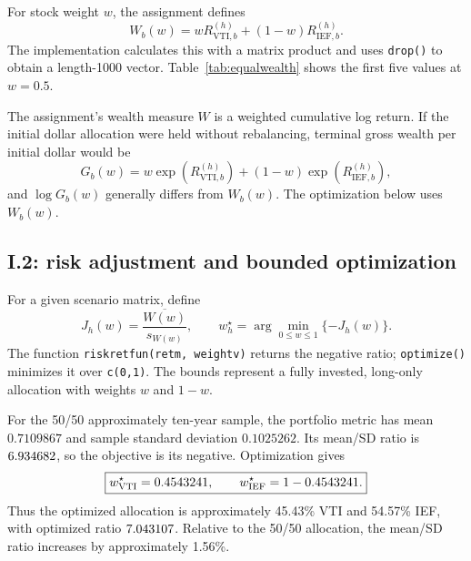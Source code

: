 \documentclass[11pt,letterpaper]{article}
\newcommand{\wideinput}[3]{%
  \begin{table}[H]\centering
  \caption{#2}\label{#3}
  \resizebox{\linewidth}{!}{}
  \end{table}}
\newcommand{\smallinput}[3]{%
  \begin{table}[H]\centering
  \caption{#2}\label{#3}
  {\small}
  \end{table}}
\begin{document}
\wideinput{ten_year_returns_first5.tex}{The first five paired approximately
ten-year bootstrap scenarios. Entries are cumulative log returns.}{tab:tenreturns}

For stock weight $w$, the assignment defines
\begin{equation}
W_b(w)=wR_{\mathrm{VTI},b}^{(h)}+(1-w)R_{\mathrm{IEF},b}^{(h)}.
\label{eq:wealth}
\end{equation}
The implementation calculates this with a matrix product and uses
\texttt{drop()} to obtain a length-1000 vector. Table~\ref{tab:equalwealth}
shows the first five values at $w=0.5$.

\smallinput{wealth_first5.tex}{The first five portfolio-metric values at the
50/50 allocation, using the scenarios in Table~\ref{tab:tenreturns}.}{tab:equalwealth}

The assignment's wealth measure $W$ is a weighted cumulative log return.
If the initial dollar allocation were
held without rebalancing, terminal gross wealth per initial dollar would be
\begin{equation}
G_b(w)=w\exp(R_{\mathrm{VTI},b}^{(h)})
       +(1-w)\exp(R_{\mathrm{IEF},b}^{(h)}),
\end{equation}
and $\log G_b(w)$ generally differs from $W_b(w)$. The optimization below
uses $W_b(w)$.

\subsection{I.2: risk adjustment and bounded optimization}
For a given scenario matrix, define
\begin{equation}
J_h(w)=\frac{\overline{W(w)}}{s_{W(w)}},\qquad
w_h^\star=\arg\min_{0\leq w\leq1}\{-J_h(w)\}.
\label{eq:objective}
\end{equation}
The function \texttt{riskretfun(retm, weightv)} returns the negative ratio;
\texttt{optimize()} minimizes it over \texttt{c(0,1)}. The bounds represent a
fully invested, long-only allocation with weights $w$ and $1-w$.

For the 50/50 approximately ten-year sample, the portfolio metric has mean
$0.7109867$ and sample standard deviation $0.1025262$. Its mean/SD ratio is
$6.934682$, so the objective is its negative. Optimization gives
\begin{equation}
\boxed{w_{\mathrm{VTI}}^\star=0.4543241,
\qquad w_{\mathrm{IEF}}^\star=1-0.4543241.}
\end{equation}
Thus the optimized allocation is approximately 45.43\% VTI and 54.57\% IEF,
with optimized ratio $7.043107$. Relative to the 50/50 allocation,
the mean/SD ratio increases by approximately 1.56\%.
\end{document}
